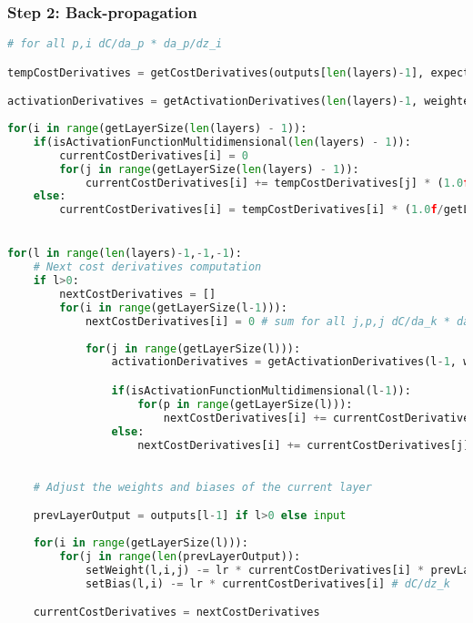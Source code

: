 \documentclass[11pt,a4paper]{report}
\begin{document}
\subsubsection{Step 2: Back-propagation}
\begin{lstlisting}[language=Python]
# for all p,i dC/da_p * da_p/dz_i

tempCostDerivatives = getCostDerivatives(outputs[len(layers)-1], expectedOutput) # vector of dC/da_j for all j

activationDerivatives = getActivationDerivatives(len(layers)-1, weightedSums[getNbLayers()-1]) # matrix of da_j/dz_i for all j and all i
 
for(i in range(getLayerSize(len(layers) - 1)):
    if(isActivationFunctionMultidimensional(len(layers) - 1)):
        currentCostDerivatives[i] = 0
        for(j in range(getLayerSize(len(layers) - 1)):
            currentCostDerivatives[i] += tempCostDerivatives[j] * (1.0f/getLayerSize(len(layers) - 1) * activationDerivatives[j][i]
    else:
        currentCostDerivatives[i] = tempCostDerivatives[i] * (1.0f/getLayerSize(len(layers) - 1) * activationDerivatives[0][i]


for(l in range(len(layers)-1,-1,-1):
    # Next cost derivatives computation
    if l>0:
        nextCostDerivatives = []
        for(i in range(getLayerSize(l-1))):
            nextCostDerivatives[i] = 0 # sum for all j,p,j dC/da_k * da_k/dz_p * dz_p/da_j * da_j/dz_i
            
            for(j in range(getLayerSize(l))):
                activationDerivatives = getActivationDerivatives(l-1, weightedSums[l-1]) # matrix of da_j/dz_i for all j and all i

                if(isActivationFunctionMultidimensional(l-1)):
                    for(p in range(getLayerSize(l))):
                        nextCostDerivatives[i] += currentCostDerivatives[p] * getWeight(l,p,j) * activationDerivatives[j][i]
                else:
                    nextCostDerivatives[i] += currentCostDerivatives[j] * getWeight(l,p,i) * activationDerivatives[0][i]
                

    # Adjust the weights and biases of the current layer

    prevLayerOutput = outputs[l-1] if l>0 else input
    
    for(i in range(getLayerSize(l))):
        for(j in range(len(prevLayerOutput)):
            setWeight(l,i,j) -= lr * currentCostDerivatives[i] * prevLayerOutput[j] # lr = learning rate and we have dC/dz_k * dz_i/dw_i,j
            setBias(l,i) -= lr * currentCostDerivatives[i] # dC/dz_k

    currentCostDerivatives = nextCostDerivatives
   
\end{lstlisting}
\end{document}
